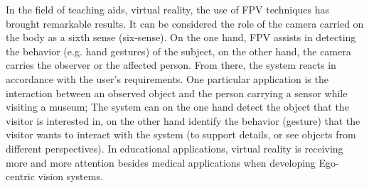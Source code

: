 In the field of teaching aids, virtual reality, the use of FPV techniques has brought remarkable results. It can be considered the role of the camera carried on the body as a sixth sense (six-sense). On the one hand, FPV assists in detecting the behavior (e.g. hand gestures) of the subject, on the other hand, the camera carries the observer or the affected person. From there, the system reacts in accordance with the user's requirements. One particular application is the interaction between an observed object and the person carrying a sensor while visiting a museum; The system can on the one hand detect the object that the visitor is interested in, on the other hand identify the behavior (gesture) that the visitor wants to interact with the system (to support details, or see objects from different perspectives). In educational applications, virtual reality is receiving more and more attention besides medical applications when developing Ego-centric vision systems.
